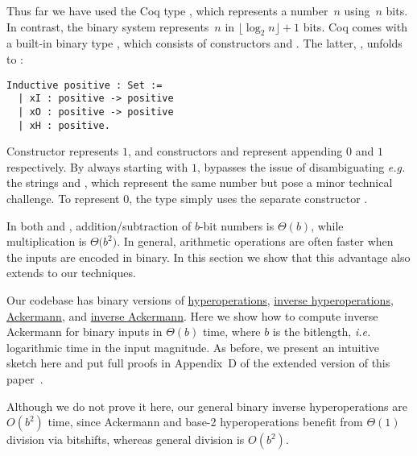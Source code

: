 Thus far we have used the Coq type , which represents
a number~$n$ using~$n$ bits.
In contrast, the binary system represents~$n$ in $\lfloor \log_{2} n \rfloor + 1$ bits.
Coq comes with a built-in binary type , 
which consists
of constructors  and . The latter, , unfolds to :

\begin{lstlisting}
Inductive positive : Set :=
  | xI : positive -> positive 
  | xO : positive -> positive
  | xH : positive.
\end{lstlisting}

Constructor  represents $1$, and constructors  and  represent
appending $0$ and $1$ respectively.
By always starting with $1$,  bypasses
the issue of disambiguating \emph{e.g.} the strings  and
, which represent the same number but pose
a minor technical challenge.
To represent $0$, the type  simply uses the separate constructor .

In both  and , addition/subtraction of $b$-bit
numbers is $\Theta(b)$, while multiplication is $\Theta \big(b^2\big)$.
In general, arithmetic operations are often faster when the inputs
are encoded in binary. 
In this section we show that this advantage also extends to our techniques.

Our codebase has binary versions of
	\href{https://github.com/inv-ack/inv-ack/blob/7270e64a2600b771f2b1b1b151f7d13fb2ae6c97/bin_repeater.v\#L78-L87}{\color{blue}hyperoperations},
	\href{https://github.com/inv-ack/inv-ack/blob/7270e64a2600b771f2b1b1b151f7d13fb2ae6c97/bin_applications.v\#L30-L36}{\color{blue}inverse hyperoperations},
	\href{https://github.com/inv-ack/inv-ack/blob/7270e64a2600b771f2b1b1b151f7d13fb2ae6c97/bin_repeater.v\#L157-L175}{\color{blue}Ackermann}, and
	\href{https://github.com/inv-ack/inv-ack/blob/7270e64a2600b771f2b1b1b151f7d13fb2ae6c97/bin_inv_ack.v\#L335-L342}{\color{blue}inverse Ackermann}.
Here we show how to compute inverse Ackermann for binary inputs in
$\Theta(b)$ time, where $b$ is the bitlength,
\emph{i.e.} logarithmic time in the input magnitude.
As before, we present an intuitive sketch here and put
full proofs in 
Appendix~D of the extended version of this paper~\cite{extendedinvack}.

\begin{rem}
Although we do not prove it here, our general binary inverse hyperoperations are $O(b^2)$ time,
since Ackermann and base-2 hyperoperations benefit from $\Theta(1)$ division via bitshifts,
whereas general division is $O(b^2)$.
\end{rem}


